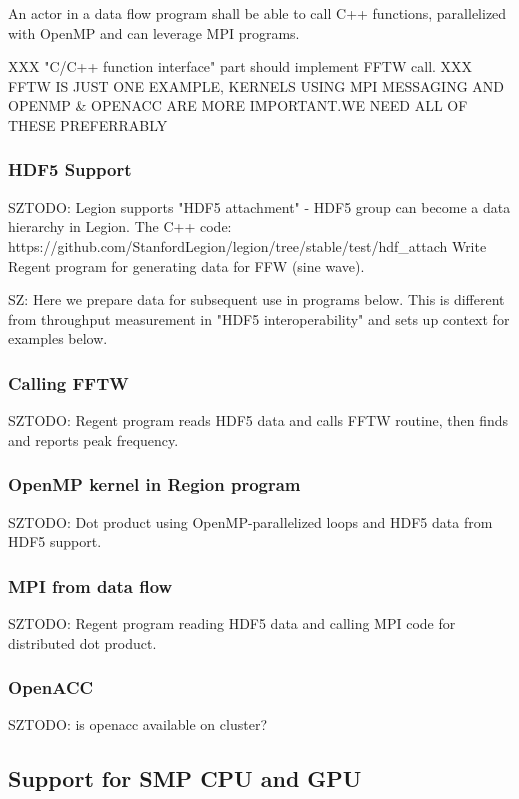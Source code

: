 \documentclass[11pt,a4paper]{article}
\begin{document}
An actor in a data flow program shall be able to call C++ functions, parallelized with OpenMP and can leverage MPI programs.

XXX "C/C++ function interface" part should implement FFTW call.  XXX FFTW IS JUST ONE EXAMPLE, KERNELS USING  MPI MESSAGING AND OPENMP & OPENACC ARE MORE IMPORTANT.WE NEED ALL OF THESE PREFERRABLY

\subsubsection{HDF5 Support}

SZTODO: Legion supports "HDF5 attachment" - HDF5 group can become a data hierarchy in Legion. The C++ code: https://github.com/StanfordLegion/legion/tree/stable/test/hdf_attach Write Regent program for generating data for FFW (sine wave).

SZ: Here we prepare data for subsequent use in programs below. This is different from throughput measurement in "HDF5 interoperability" and sets up context for examples below.

\subsubsection{Calling FFTW}

SZTODO: Regent program reads HDF5 data and calls FFTW routine, then finds and reports peak frequency.

\subsubsection{OpenMP kernel in Region program}

SZTODO: Dot product using OpenMP-parallelized loops and HDF5 data from HDF5 support.

\subsubsection{MPI from data flow}

SZTODO: Regent program reading HDF5 data and calling MPI code for distributed dot product.

\subsubsection{OpenACC}

SZTODO: is openacc available on cluster?

\subsection{Support for SMP CPU and GPU}
\end{document}
